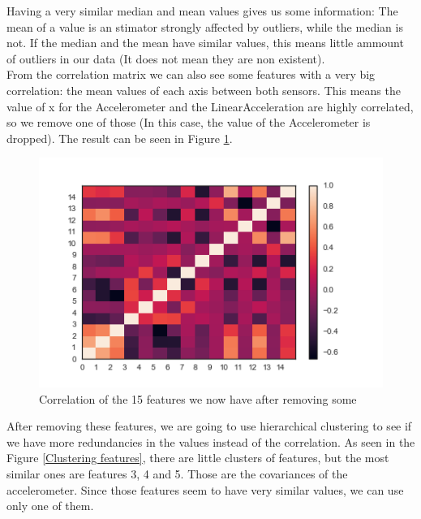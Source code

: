 \documentclass[idxtotoc,hyperref,openany]{labbook} %
\begin{document}
Having a very similar median and mean values gives us some information: The mean of a value is an stimator strongly affected by outliers, while the median is not. If the median and the mean have similar values, this means little ammount of outliers in our data (It does not mean they are non existent).\\

From the correlation matrix we can also see some features with a very big correlation: the mean values of each axis between both sensors. This means the value of x for the Accelerometer and the LinearAcceleration are highly correlated, so we remove one of those (In this case, the value of the Accelerometer is dropped). The result can be seen in Figure \ref{Correlation postdrop}.

\begin{figure}[h]
\includegraphics[width=0.9\linewidth]{Features_CorrelationMatrix_postDrop_Day1.png}
\setlength\belowcaptionskip{-10pt}
\caption{Correlation of the 15 features we now have after removing some}
\label{Correlation postdrop}
\end{figure}

After removing these features, we are going to use hierarchical clustering to see if we have more redundancies in the values instead of the correlation. As seen in the Figure \ref{Clustering features}, there are little clusters of features, but the most similar ones are features 3, 4 and 5. Those are the covariances of the accelerometer. Since those features seem to have very similar values, we can use only one of them.
\end{document}
